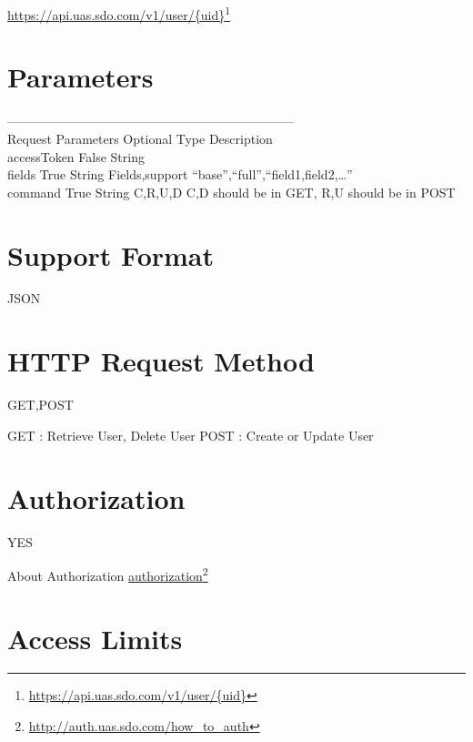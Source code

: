 \href{https://api.uas.sdo.com/v1/user/{uid}}{https:/\slash api.uas.sdo.com\slash v1\slash user\slash \{uid\}}\footnote{\href{https://api.uas.sdo.com/v1/user/{uid}}{https:/\slash api.uas.sdo.com\slash v1\slash user\slash \{uid\}}}

\section{Parameters}
\label{parameters}

\textbar{}--------------------------------------------------------------------\textbar{}\\
\textbar{}Request Parameters \textbar{} Optional \textbar{} Type \textbar{} Description \textbar{}\\
\textbar{}accessToken \textbar{} False \textbar{} String \textbar{} \textbar{}\\
\textbar{}fields \textbar{} True \textbar{} String \textbar{} Fields,support ``base'',``full'',``field1,field2,{\ldots}''\\
\textbar{}command \textbar{} True \textbar{} String \textbar{} C,R,U,D C,D should be in GET, R,U should be in POST 

\section{Support Format}
\label{supportformat}

JSON 

\section{HTTP Request Method}
\label{httprequestmethod}

GET,POST

GET : Retrieve User, Delete User
POST : Create or Update User

\section{Authorization}
\label{authorization}

YES

About Authorization \href{http://auth.uas.sdo.com/how_to_auth}{authorization}\footnote{\href{http://auth.uas.sdo.com/how_to_auth}{http:/\slash auth.uas.sdo.com\slash how\_to\_auth}} 

\section{Access Limits}
\label{accesslimits}

